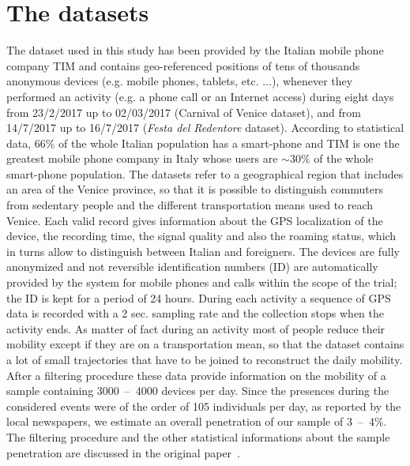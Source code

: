 \documentclass{standalone}
\begin{document}
\section*{The datasets}

The dataset used in this study has been provided by the Italian mobile phone company TIM and contains geo-referenced positions of tens of thousands anonymous devices (e.g. mobile phones, tablets, etc. ...), whenever they performed an activity (e.g. a phone call or an Internet access) during eight days from 23/2/2017 up to 02/03/2017 (Carnival of Venice dataset), and from 14/7/2017 up to 16/7/2017 (\emph{Festa del Redentore} dataset).
According to statistical data, 66\% of the whole Italian population has a smart-phone and TIM is one the greatest mobile phone company in Italy whose users are $\sim30\%$ of the whole smart-phone population.
The datasets refer to a geographical region that includes an area of the Venice province, so that it is possible to distinguish commuters from sedentary people and the different transportation means used to reach Venice.
Each valid record gives information about the GPS localization of the device, the recording time, the signal quality and also the roaming status, which in turns allow to distinguish between Italian and
foreigners.
The devices are fully anonymized and not reversible identification numbers (ID) are automatically provided by the system for mobile phones and calls within the scope of the trial; the ID is kept for a period of 24 hours.
During each activity a sequence of GPS data is recorded with a 2 sec. sampling rate and the collection stops when the activity ends.
As matter of fact during an activity most of people reduce their mobility except if they are on a transportation mean, so that the dataset contains a lot of small trajectories that have to be joined to reconstruct the daily mobility.
After a filtering procedure these data provide information on the mobility of a sample containing 3000~–~4000 devices per day.
Since the presences during the considered events were of the order of 105 individuals per day, as reported by the local newspapers, we estimate an overall penetration of our sample of 3~–~4\%.
The filtering procedure and the other statistical informations about the sample penetration are discussed in the original paper~\cite{Mizzi2018}.
\end{document}
